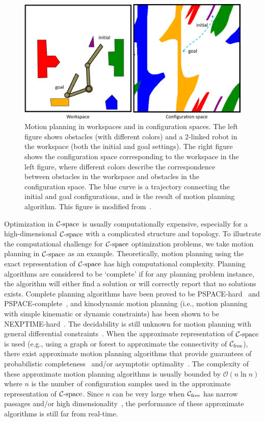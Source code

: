 \begin{figure}[!htb]
  \centering
  \includegraphics[width=\linewidth]{figs/1/planning-crop.pdf}
  \caption[Motion planning in workspaces and in configuration spaces]{Motion planning in workspaces and in configuration spaces. The left figure shows obstacles (with different colors) and a 2-linked robot in the workspace (both the initial and goal settings). The right figure shows the configuration space corresponding to the workspace in the left figure, where different colors describe the correspondence between obstacles in the workspace and obstacles in the configuration space. The blue curve is a trajectory connecting the initial and goal configurations, and is the result of motion planning algorithm. This figure is modified from~\cite{cspaceJapplet}. \label{fig:1:planning}}
\end{figure}


Optimization in $\mathcal C\text{-space}$ is usually computationally expensive, especially for a high-dimensional $\mathcal C\text{-space}$ with a complicated structure and topology. To illustrate the computational challenge for $\mathcal C\text{-space}$ optimization problems, we take motion planning in $\mathcal C\text{-space}$ as an example. Theoretically, motion planning using the exact representation of $\mathcal C\text{-space}$ has high computational complexity. Planning algorithms are considered to be `complete' if for any planning problem instance, the algorithm will either find a solution or will correctly report that no solutions exists. Complete planning algorithms have been proved to be PSPACE-hard~\cite{Reif:1979:CMP} and PSPACE-complete~\cite{Canny:1988:AGC}, and kinodynamic motion planning (i.e., motion planning with simple kinematic or dynamic constraints) has been shown to be NEXPTIME-hard~\cite{Canny:1988:CKP}. 
The decidability is still unknown for motion planning with general differential constraints~\cite{Cheng:2007:DMP}. When the approximate representation of $\mathcal C\text{-space}$ is used (e.g., using a graph or forest to approximate the connectivity of $\mathcal C_{\text{free}}$), there exist approximate motion planning algorithms that provide guarantees of probabilistic completeness~\cite{Kavraki96,Kuffner00} and/or asymptotic optimality~\cite{Sertac:IJRR:2011}. The complexity of these approximate motion planning algorithms is usually bounded by $\mathcal O(n\ln n)$ where $n$ is the number of configuration samples used in the approximate representation of $\mathcal C\text{-space}$. Since $n$ can be very large when $\mathcal C_{\text{free}}$ has narrow passages and/or high dimensionality~\cite{Hsu:2006:ijrr}, the performance of these approximate algorithms is still far from real-time.

